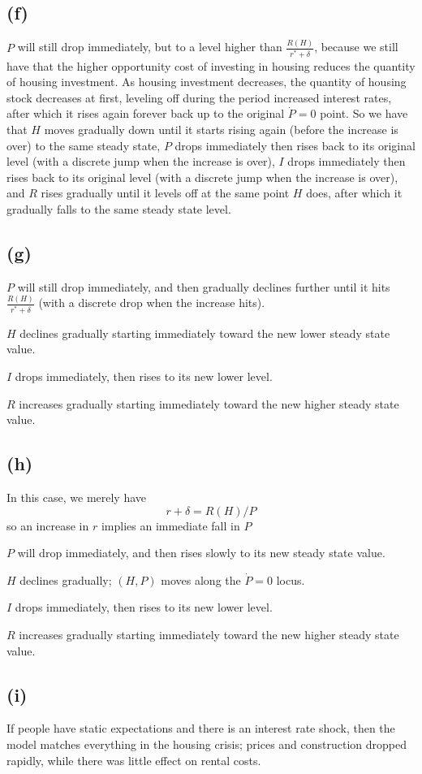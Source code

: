\documentclass[11pt]{amsart}
\begin{document}
\subsection*{(f)}

$P$ will still drop immediately, but to a level higher than $\frac{R(H)}{r^{*} + \delta}$, because we still have that the higher opportunity cost of investing in housing reduces the quantity of housing investment.
As housing investment decreases, the quantity of housing stock decreases at first, leveling off during the period increased interest rates, after which it rises again forever back up to the original $\dot{P}=0$ point. 
So we have that $H$ moves gradually down until it starts rising again (before the increase is over) to the same steady state, $P$ drops immediately then rises back to its original level (with a discrete jump when the increase is over), $I$ drops immediately then rises back to its original level (with a discrete jump when the increase is over), and $R$ rises gradually until it levels off at the same point $H$ does, after which it gradually falls to the same steady state level.

\subsection*{(g)}

$P$ will still drop immediately, and then gradually declines further until it hits $\frac{R(H)}{r^{*} + \delta}$ (with a discrete drop when the increase hits).

$H$ declines gradually starting immediately toward the new lower steady state value. 

$I$ drops immediately, then rises to its new lower level.

$R$ increases gradually starting immediately toward the new higher steady state value.


\subsection*{(h)}

In this case, we merely have
\[
r + \delta = R(H) / P
\]
so an increase in $r$ implies an immediate fall in $P$

$P$ will drop immediately, and then rises slowly to its new steady state value. 

$H$ declines gradually; $(H,P)$ moves along the $\dot{P} = 0$ locus.

$I$ drops immediately, then rises to its new lower level.

$R$ increases gradually starting immediately toward the new higher steady state value.

\subsection*{(i)}

If people have static expectations and there is an interest rate shock, then the model matches everything in the housing crisis; prices and construction dropped rapidly, while there was little effect on rental costs.
\end{document}
